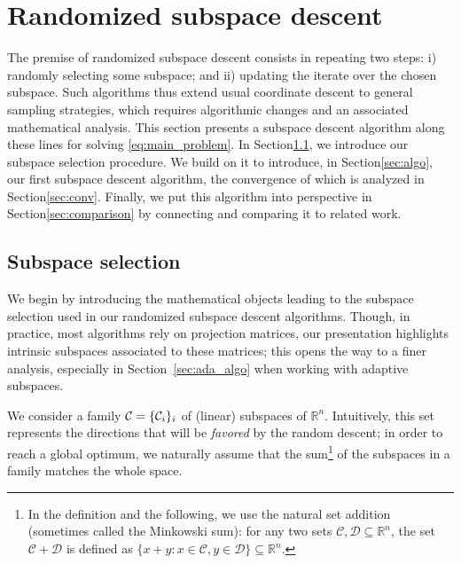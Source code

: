 \section{Randomized subspace descent}
\label{sec:mor-randomized-subspace}


The premise of randomized subspace descent consists in repeating two steps: i) randomly selecting some subspace; and ii) updating the iterate over the chosen subspace. {Such algorithms thus extend usual coordinate descent to general sampling strategies, which requires algorithmic changes and an associated mathematical analysis. }
This section presents a subspace descent algorithm along these lines for solving \eqref{eq:main_problem}. In Section\;\ref{sec:sub}, we introduce our subspace selection procedure. We build on it to introduce, in Section\;\ref{sec:algo}, our first subspace descent algorithm, the convergence of which is analyzed in Section\;\ref{sec:conv}. Finally, we put this algorithm into perspective in Section\;\ref{sec:comparison} by connecting and comparing it to related work.

\subsection{Subspace selection}\label{sec:sub}

We begin by introducing the mathematical objects leading to the subspace selection used in our randomized subspace descent algorithms. Though, in practice, most algorithms rely on projection matrices, our presentation highlights intrinsic subspaces associated to these matrices; this opens the way to a finer analysis, especially in Section~\ref{sec:ada_algo} when working with adaptive subspaces. 

We consider a family $\mathcal{C} = \{ \mathcal{C}_i \}_i$ of {(linear)} subspaces of $\mathbb{R}^n$. Intuitively, this set represents the directions that will be \emph{favored} by the random descent; in order to reach a global optimum, we naturally assume that the sum\footnote{In the definition and the following, we use the natural set addition (sometimes called the Minkowski sum): for any two sets $\mathcal{C},\mathcal{D}\subseteq\mathbb{R}^n$, the set  $\mathcal{C} + \mathcal{D}$ is defined as $\{x+y : x\in\mathcal{C},y\in\mathcal{D}\}\subseteq\mathbb{R}^n$.} of the subspaces in a family matches the whole space.%

